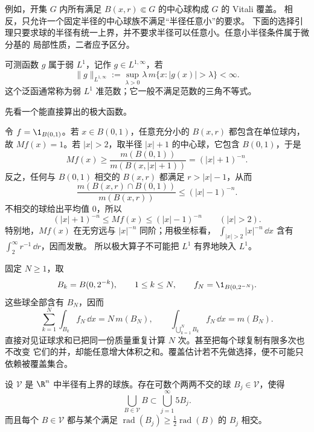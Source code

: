 例如，开集 $G$ 内所有满足 $B(x,r)\Subset G$ 的中心球构成 $G$ 的 Vitali 覆盖。
相反，只允许一个固定半径的中心球族不满足“半径任意小”的要求。
下面的选择引理只要求球的半径有统一上界，并不要求半径可以任意小。任意小半径条件属于微分基的
局部性质，二者应予区分。

\begin{definition}[弱 $L^1$ 空间]\label{def:4-1-1-3}
可测函数 $g$ 属于弱 $L^1$，记作 $g\in L^{1,\infty}$，若
\[
  \|g\|_{L^{1,\infty}}
  :=\sup_{\lambda>0}\lambda\,m\{x:|g(x)|>\lambda\}<\infty.
\]
这个泛函通常称为弱 $L^1$ 准范数；它一般不满足范数的三角不等式。
\end{definition}

先看一个能直接算出的极大函数。

\begin{example}[球的示性函数]\label{ex:4-1-1-1}
令 $f=\1_{B(0,1)}$。若 $x\in B(0,1)$，任意充分小的 $B(x,r)$ 都包含在单位球内，故
$Mf(x)=1$。若 $|x|>2$，取半径 $|x|+1$ 的中心球，它包含 $B(0,1)$，于是
\[
  Mf(x)\ge \frac{m(B(0,1))}{m(B(x,|x|+1))}=(|x|+1)^{-n}.
\]
反之，任何与 $B(0,1)$ 相交的 $B(x,r)$ 都满足 $r>|x|-1$，从而
\[
 \frac{m(B(x,r)\cap B(0,1))}{m(B(x,r))}
 \le (|x|-1)^{-n}.
\]
不相交的球给出平均值 $0$，所以
\[
 (|x|+1)^{-n}\le Mf(x)\le(|x|-1)^{-n}\qquad(|x|>2).
\]
特别地，$Mf(x)$ 在无穷远与 $|x|^{-n}$ 同阶；用极坐标看，
$\int_{|x|>2}|x|^{-n}\,\dd x$ 含有 $\int_2^\infty r^{-1}\,\dd r$，因而发散。
所以极大算子不可能把 $L^1$ 有界地映入 $L^1$。
\end{example}

\begin{example}[高度重叠的球族]\label{ex:4-1-1-2}
固定 $N\ge1$，取
\[
 B_k=B(0,2^{-k}),\qquad 1\le k\le N,
 \qquad f_N=\1_{B(0,2^{-N})}.
\]
这些球全部含有 $B_N$，因而
\[
 \sum_{k=1}^N\int_{B_k}f_N\,\dd x
 =N\,m(B_N),
 \qquad
 \int_{\bigcup_{k=1}^NB_k}f_N\,\dd x=m(B_N).
\]
直接对见证球求和已把同一份质量重复计算 $N$ 次。甚至把每个球复制有限多次也不改变
它们的并，却能任意增大体积之和。覆盖估计若不先做选择，便不可能只依赖被覆盖集合。
\end{example}

\begin{lemma}[$5r$ 覆盖引理]\label{lemma:4-1-1-1}
设 $\mathcal V$ 是 $\R^n$ 中半径有上界的球族。存在可数个两两不交的球
$B_j\in\mathcal V$，使得
\[
  \bigcup_{B\in\mathcal V}B\subset\bigcup_{j=1}^{\infty}5B_j.
\]
而且每个 $B\in\mathcal V$ 都与某个满足
$\operatorname{rad}(B_j)\ge\tfrac12\operatorname{rad}(B)$ 的 $B_j$ 相交。
\end{lemma}

